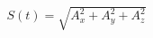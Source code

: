 \documentclass[preview]{standalone}
\begin{document}
\begin{align*}
S(t) = \sqrt{A_x^2 + A_y^2 + A_z^2}
\end{align*}
\end{document}
